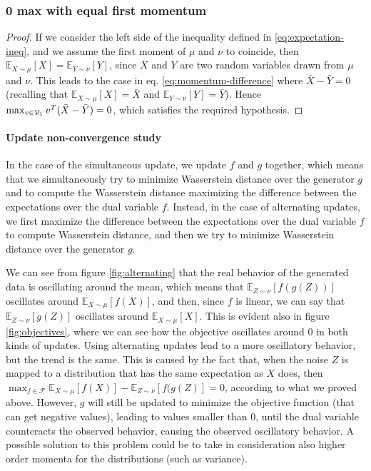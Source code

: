 \documentclass[12pt]{article}
\begin{document}
\subsubsection{0 max with equal first momentum} \label{subsub:zero-difference}
\begin{proof}
If we consider the left side of the inequality defined in \eqref{eq:expectation-ineq}, and we assume the first moment of $\mu$ and $\nu$ to coincide, then $\mathbb{E}_{X \sim \mu} [X] =  \mathbb{E}_{Y \sim \nu} [Y]$, since $X$ and $Y$ are two random variables drawn from $\mu$ and $\nu$. This leads to the case in eq. \eqref{eq:momentum-difference} where $\bar{X} - \bar{Y} = 0$ (recalling that $\mathbb{E}_{X \sim \mu} [X] = \bar{X}$ and $\mathbb{E}_{Y \sim \nu} [Y] = \bar{Y}$). Hence $\max_{v \in \mathcal{V}_1} v^{T}(\Bar{X} - \Bar{Y}) = 0$, which satisfies the required hypothesis.
\end{proof}

\paragraph{Update non-convergence study}
In the case of the simultaneous update, we update $f$ and $g$ together, which means that we simultaneously try to minimize Wasserstein distance over the generator $g$ and to compute the Wasserstein distance maximizing the difference between the expectations over the dual variable $f$. Instead, in the case of alternating updates, we first maximize the difference between the expectations over the dual variable $f$ to compute Wasserstein distance, and then we try to minimize Wasserstein distance over the generator $g$.

We can see from figure \ref{fig:alternating} that the real behavior of the generated data is oscillating around the mean, which means that $\mathbb{E}_{Z \sim \nu} [f(g(Z))]$ oscillates around $\mathbb{E}_{X \sim \mu} [f(X)]$, and then, since $f$ is linear, we can say that $\mathbb{E}_{Z \sim \nu} [g(Z)]$ oscillates around $\mathbb{E}_{X \sim \mu} [X]$. This is evident also in figure \ref{fig:objectives}, where we can see how the objective oscillates around 0 in both kinds of updates. Using alternating updates lead to a more oscillatory behavior, but the trend is the same. This is caused by the fact that, when the noise $Z$ is mapped to a distribution that has the same expectation as $X$ does, then $\max_{f \in \mathcal{F}} \mathbb{E}_{X \sim \mu} [f(X)] - \mathbb{E}_{Z \sim \nu} [f(g(Z)] = 0$, according to what we proved above. However, $g$ will still be updated to minimize the objective function (that can get negative values), leading to values smaller than 0, until the dual variable counteracts the observed behavior, causing the observed oscillatory behavior. A possible solution to this problem could be to take in consideration also higher order momenta for the distributions (such as variance).
\end{document}
